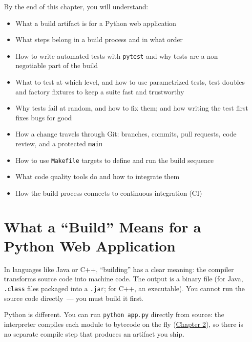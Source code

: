 \begin{objectives}

By the end of this chapter, you will understand:

\begin{itemize}
\tightlist
\item
  What a build artifact is for a Python web application
\item
  What steps belong in a build process and in what order
\item
  How to write automated tests with \texttt{pytest} and why tests are a non-negotiable part of the build
\item
  What to test at which level, and how to use parametrized tests, test doubles and factory fixtures to keep a suite fast and trustworthy
\item
  Why tests fail at random, and how to fix them; and how writing the test first fixes bugs for good
\item
  How a change travels through Git: branches, commits, pull requests, code review, and a protected \texttt{main}
\item
  How to use \texttt{Makefile} targets to define and run the build sequence
\item
  What code quality tools do and how to integrate them
\item
  How the build process connects to continuous integration (CI)
\end{itemize}

\end{objectives}

\setcounter{section}{0}
\section{What a ``Build'' Means for a Python Web Application}\label{17-build-process:171-what-a-build-means-for-a-python-web-application}

In languages like Java or C++, ``building'' has a clear meaning: the compiler transforms source code into machine code. The output is a binary file (for Java, \texttt{.class} files packaged into a \texttt{.jar}; for C++, an executable). You cannot run the source code directly~--- you must build it first.

Python is different. You can run \texttt{python\ app.py} directly from source: the interpreter compiles each module to bytecode on the fly (\hyperref[ch:02-runtime-initialization]{Chapter 2}), so there is no separate compile step that produces an artifact you ship.

